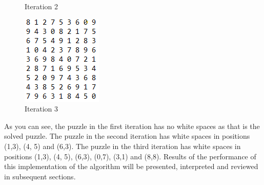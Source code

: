 \documentclass{article}
\begin{document}
\begin{figure}[!htb]
      \caption{Iteration 2}\label{fig:awesome_image2}
    \endminipage\hfill
      \includegraphics[width=\linewidth]{iteration3.png}
      \caption{Iteration 3}\label{fig:awesome_image3}
    \endminipage
    \end{figure}


    As you can see, the puzzle in the first iteration has no white spaces as that is the solved puzzle. The puzzle in the second iteration has white spaces in positions (1,3), (4, 5) and (6,3). The puzzle in the third iteration has white spaces in positions (1,3), (4, 5), (6,3), (0,7), (3,1) and (8,8). Results of the performance of this implementation of the algorithm will be presented, interpreted and reviewed in subsequent sections.

    
    \pagebreak 
\end{document}
